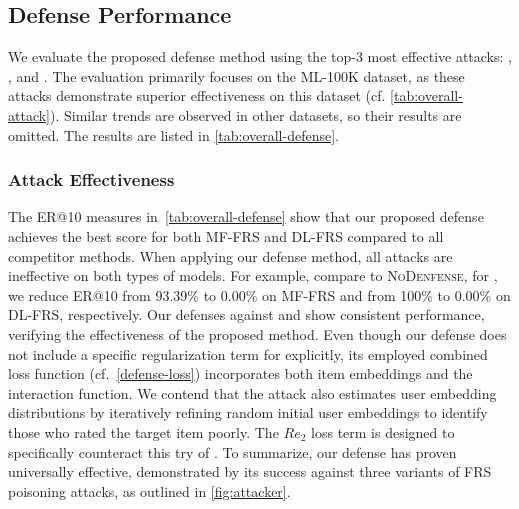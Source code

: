 \subsection{Defense Performance}
\label{exp:defense_performance}
We evaluate the proposed defense method using the top-3 most effective attacks: \modelI{}, \modelII{}, and \AHUM{}. The evaluation primarily focuses on the ML-100K dataset, as these attacks demonstrate superior effectiveness on this dataset (cf. \cref{tab:overall-attack}). Similar trends are observed in other datasets, so their results are omitted. The results are listed in \cref{tab:overall-defense}.

\subsubsection{Attack Effectiveness}
The ER@10 measures in~\cref{tab:overall-defense} show that our proposed defense achieves the best score for both MF-FRS and DL-FRS compared to all competitor methods.
When applying our defense method, all attacks are ineffective on both types of models.
For example, compare to \textsc{NoDenfense}, for \modelII{}, we reduce ER@10 from 93.39\% to 0.00\% on MF-FRS and from 100\% to 0.00\% on DL-FRS, respectively.
Our defenses against \AHUM{} and \modelI{} show consistent performance, verifying the effectiveness of the proposed method.
Even though our defense does not include a specific regularization term for \AHUM{} explicitly, its employed combined loss function (cf.\ \cref{defense-loss}) incorporates both item embeddings and the interaction function. 
We contend that the \AHUM{} attack also estimates user embedding distributions by iteratively refining random initial user embeddings to identify those who rated the target item poorly. The $Re_2$ loss term is designed to specifically counteract this try of \AHUM{}. To summarize, our defense has proven universally effective, demonstrated by its success against three variants of FRS poisoning attacks, as outlined in \cref{fig:attacker}.

